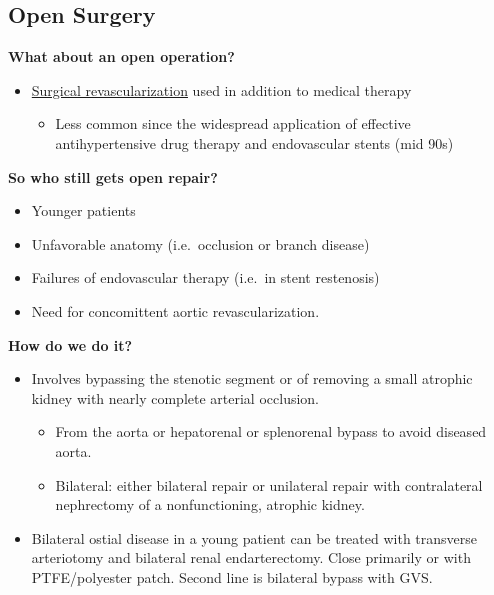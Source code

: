 \documentclass[
]{book}
\providecommand{\tightlist}{%
  \setlength{\itemsep}{0pt}\setlength{\parskip}{0pt}}
\begin{document}
\hypertarget{open-surgery}{%
\subsection{Open Surgery}\label{open-surgery}}

\textbf{What about an open operation?}

\begin{itemize}
\item
  \uline{Surgical revascularization} used in addition to medical
  therapy

  \begin{itemize}
  \tightlist
  \item
    Less common since the widespread application of effective
    antihypertensive drug therapy and endovascular stents (mid 90s)
  \end{itemize}
\end{itemize}

\textbf{So who still gets open repair?} \citep{benjamin126RenovascularDisease2019}

\begin{itemize}
\tightlist
\item
  Younger patients
\item
  Unfavorable anatomy (i.e.~occlusion or branch disease)
\item
  Failures of endovascular therapy (i.e.~in stent restenosis)
\item
  Need for concomittent aortic revascularization.
\end{itemize}

\textbf{How do we do it?}

\begin{itemize}
\item
  Involves bypassing the stenotic segment or of removing a small
  atrophic kidney with nearly complete arterial occlusion.

  \begin{itemize}
  \item
    From the aorta or hepatorenal or splenorenal bypass to avoid
    diseased aorta.
  \item
    Bilateral: either bilateral repair or unilateral repair with
    contralateral nephrectomy of a nonfunctioning, atrophic kidney.
  \end{itemize}
\item
  Bilateral ostial disease in a young patient can be treated with
  transverse arteriotomy and bilateral renal endarterectomy. Close
  primarily or with PTFE/polyester patch. Second line is bilateral
  bypass with GVS. \citep{benjamin126RenovascularDisease2019}
\end{itemize}
\end{document}

